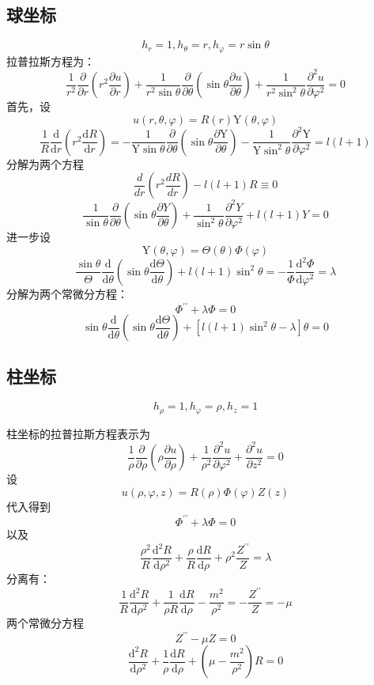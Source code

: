 \documentclass[a4paper]{ctexart}
\begin{document}
\subsection{球坐标}
$$
    h_r=1,h_{\theta}=r,h_{\varphi}=r\sin \theta
$$
拉普拉斯方程为：
\[
    \frac{1}{r^{2}} \frac{\partial}{\partial r}\left(r^{2} \frac{\partial u}{\partial r}\right)+\frac{1}{r^{2} \sin \theta} \frac{\partial}{\partial \theta}\left(\sin \theta \frac{\partial u}{\partial \theta}\right)+\frac{1}{r^{2} \sin ^{2} \theta} \frac{\partial^{2} u}{\partial \varphi^{2}}=0
\]
首先，设
\[
    u(r, \theta, \varphi)=R(r) \mathrm{Y}(\theta, \varphi)
\]
\[
    \frac{1}{R} \frac{\mathrm{d}}{\mathrm{d} r}\left(r^{2} \frac{\mathrm{d} R}{\mathrm{d} r}\right)=-\frac{1}{\mathrm{Y} \sin \theta} \frac{\partial}{\partial \theta}\left(\sin \theta \frac{\partial \mathrm{Y}}{\partial \theta}\right)-\frac{1}{\mathrm{Y} \sin ^{2} \theta} \frac{\partial^{2} \mathrm{Y}}{\partial \varphi^{2}}=l(l+1)
\]
分解为两个方程
\[
    \frac{d}{d r}\left(r^{2} \frac{d R}{d r}\right)-l(l+1) R \equiv 0
\]
\[
    \frac{1}{\sin \theta} \frac{\partial}{\partial \theta}\left(\sin \theta \frac{\partial Y}{\partial \theta}\right)+\frac{1}{\sin ^{2} \theta} \frac{\partial^{2} Y}{\partial \varphi^{2}}+l(l+1) Y=0
\]
进一步设
\[
    \mathrm{Y}(\theta, \varphi)=\Theta(\theta) \Phi(\varphi)
\]
\[
    \frac{\sin \theta}{\Theta} \frac{\mathrm{d}}{\mathrm{d} \theta}\left(\sin \theta \frac{\mathrm{d} \Theta}{\mathrm{d} \theta}\right)+l(l+1) \sin ^{2} \theta=-\frac{1}{\Phi} \frac{\mathrm{d}^{2} \Phi}{\mathrm{d} \varphi^{2}}=\lambda
\]
分解为两个常微分方程：
\[
    \Phi^{\prime \prime}+\lambda \Phi=0
\]
\[
    \sin \theta \frac{\mathrm{d}}{\mathrm{d} \theta}\left(\sin \theta \frac{\mathrm{d} \Theta}{\mathrm{d} \theta}\right)+\left[l(l+1) \sin ^{2} \theta-\lambda\right] \theta=0
\]
\subsection{柱坐标}
$$
    h_{\rho}=1,h_{\varphi}=\rho ,h_z=1
$$

柱坐标的拉普拉斯方程表示为
\[
    \frac{1}{\rho} \frac{\partial}{\partial \rho}\left(\rho \frac{\partial u}{\partial \rho}\right)+\frac{1}{\rho^{2}} \frac{\partial^{2} u}{\partial \varphi^{2}}+\frac{\partial^{2} u}{\partial z^{2}}=0
\]
设
\[
    u(\rho, \varphi, z)=R(\rho) \Phi(\varphi) Z(z)
\]
代入得到
\[
    \Phi^{\prime \prime}+\lambda \Phi=0
\]
以及
\[
    \frac{\rho^{2}}{R} \frac{\mathrm{d}^{2} R}{\mathrm{d} \rho^{2}}+\frac{\rho}{R} \frac{\mathrm{d} R}{\mathrm{d} \rho}+\rho^{2} \frac{Z^{\prime \prime}}{Z}=\lambda
\]
分离有：
\[
    \frac{1}{R} \frac{\mathrm{d}^{2} R}{\mathrm{d} \rho^{2}}+\frac{1}{\rho R} \frac{\mathrm{d} R}{\mathrm{d} \rho}-\frac{m^{2}}{\rho^{2}}=-\frac{Z^{\prime \prime}}{Z}=-\mu
\]
两个常微分方程
\[
    Z^{\prime \prime}-\mu Z=0
\]
\[
    \frac{\mathrm{d}^{2} R}{\mathrm{d} \rho^{2}}+\frac{1}{\rho} \frac{\mathrm{d} R}{\mathrm{d} \rho}+\left(\mu-\frac{m^{2}}{\rho^{2}}\right) R=0
\]
\end{document}
